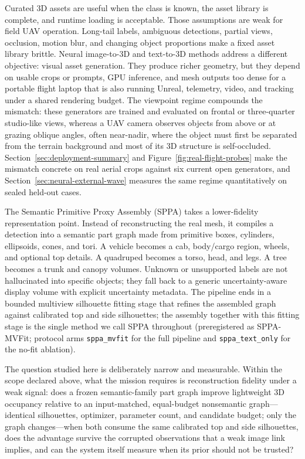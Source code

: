 \documentclass[11pt,a4paper]{article}
\begin{document}
Curated 3D assets are useful when the class is known, the asset library is
complete, and runtime loading is acceptable. Those assumptions are weak for
field UAV operation. Long-tail labels, ambiguous detections, partial views,
occlusion, motion blur, and changing object proportions make a fixed asset
library brittle. Neural image-to-3D and text-to-3D methods address a different
objective: visual asset generation. They produce richer geometry, but they
depend on usable crops or prompts, GPU inference, and mesh outputs too dense
for a portable flight laptop that is also running Unreal, telemetry,
video, and tracking under a shared rendering budget. The viewpoint regime
compounds the mismatch: these generators are trained and evaluated on
frontal or three-quarter studio-like views, whereas a UAV camera observes
objects from above or at grazing oblique angles, often near-nadir, where the
object must first be separated from the terrain background and most of its
3D structure is self-occluded.
Section~\ref{sec:deployment-summary} and
Figure~\ref{fig:real-flight-probes} make the mismatch concrete on real
aerial crops against six current open generators, and
Section~\ref{sec:neural-external-wave} measures the same regime
quantitatively on sealed held-out cases.

The Semantic Primitive Proxy Assembly (SPPA) takes a lower-fidelity
representation point. Instead of reconstructing
the real mesh, it compiles a detection into a semantic part graph made from
primitive boxes, cylinders, ellipsoids, cones, and tori. A vehicle becomes a
cab, body/cargo region, wheels, and optional top details. A quadruped becomes a
torso, head, and legs. A tree becomes a trunk and canopy volumes. Unknown or
unsupported labels are not hallucinated into specific objects; they fall back to
a generic uncertainty-aware display volume with explicit uncertainty metadata.
The pipeline ends in a bounded multiview silhouette fitting stage that refines
the assembled graph against calibrated top and side silhouettes; the assembly
together with this fitting stage is the single method we call SPPA throughout
(preregistered as SPPA-MVFit; protocol arms \texttt{sppa\_mvfit} for the full
pipeline and \texttt{sppa\_text\_only} for the no-fit ablation).

The question studied here is deliberately narrow and measurable. Within the
scope declared above, what the mission requires is reconstruction fidelity
under a weak signal: does a frozen semantic-family part graph improve
lightweight 3D occupancy relative to an input-matched, equal-budget
nonsemantic graph---identical silhouettes, optimizer, parameter count, and
candidate budget; only the graph changes---when both consume the same
calibrated top and side silhouettes, does the advantage survive the
corrupted observations that a weak image link implies, and can the system
itself measure when its prior should not be trusted?
\end{document}
